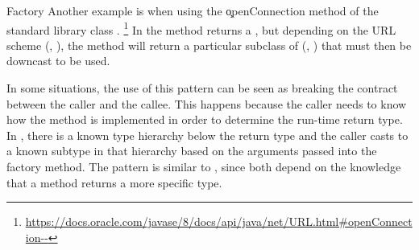 \begin{pattern}{Factory}
Another example is when using the \c{openConnection} method
of the standard library class .%
\footnote{\url{https://docs.oracle.com/javase/8/docs/api/java/net/URL.html\#openConnection--}}
In the method returns a , but depending on the URL scheme
(\eg, ), the method will return a particular subclass 
of  (\eg, )
that must then be downcast to be used.

\discussion{}
In some situations, the use of this pattern can be seen as breaking the contract \api{} between the caller and the callee.
This happens because the caller needs to know how the method is implemented in order to determine the run-time return type.
  In \thisp{}, there is a known type hierarchy 
  below the return type and the caller casts to a known subtype
  in that hierarchy based on the arguments passed into the factory method.
%
The  pattern is similar to \thisp{},
since both depend on the knowledge that a method returns a more specific type.

\end{pattern}
